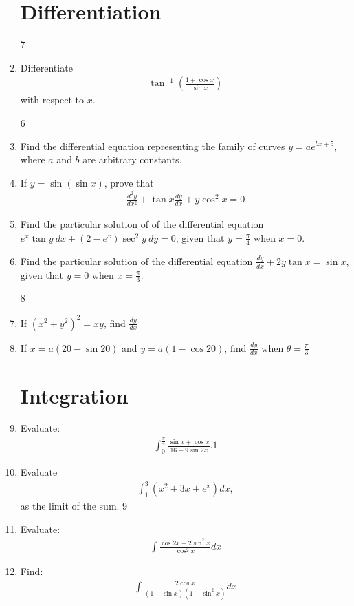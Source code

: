 \documentclass[10pt,-letter paper]{article}
\providecommand{\brak}[1]{\ensuremath{\left(#1\right)}}
\begin{document}
\begin{enumerate}
   \section{Differentiation}
 
7  \item Differentiate 
	\begin{align*}
	 \tan^{-1}\brak{\frac{1+\cos x}{\sin x}} 
	\end{align*} 
		with respect to $x$.
  

6 \item Find the differential equation representing the family of curves $y=ae^{bx+5}$, where $a$ and $b$ are arbitrary constants.

\item If $y=\sin\brak{\sin x}$, prove that 
		\begin{align*}
			\frac{d^{2}y}{dx^{2}}+\tan x \frac{dy}{dx}+y\cos^{2}x=0
		\end{align*}
	\item Find the particular solution of of the differential equation $e^{x}\tan y~ dx +\brak{2-e^{x}}\sec^{2} y ~dy=0$, given that $y=\frac{\pi}{4}$ when $x=0$. 
	\item Find the particular solution of the differential equation  $\frac{dy}{dx}+2y\tan x =\sin x$, given that $y=0$ when $x=\frac{\pi}{3}$.
 
 8 \item If ${\brak{x^{2}+y^{2}}}^{2}=xy$, find $\frac{dy}{dx}$

\item If $x=a\brak{20-\sin 20}$ and $y=a\brak{1-\cos 20}$, find $\frac{dy}{dx}$ when $\theta=\frac{\pi}{3}$

\section{Integration}
\item Evaluate: 
\begin{align*}
	\int_{0}^{\frac{\pi}{4}}\frac{\sin x+\cos x}{16+9 \sin 2x}.1
\end{align*}
\item Evaluate 
	\begin{align*}
		\int_{1}^{3} \brak{x^{2}+3x+e^{x}}dx,
	\end{align*}
	as the limit of the sum.
9 \item Evaluate:
			\begin{align*}
			\int\frac{\cos 2x+2\sin^{2}x}{\cos^{2}x}dx
				\end{align*}
\item Find:
	\begin{align*}
		\int\frac{2\cos x}{\brak{1-\sin x}\brak{1+\sin^{2}x}}dx
	\end{align*}
 

\end{enumerate}
\end{document}
